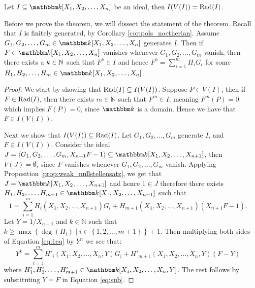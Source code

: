 \begin{theorem}\label{thm:hilbert_nullstellensatz}
  Let $I \subseteq \K[X_1, X_2, \ldots, X_{n}]$ be an ideal, then $I(V(I)) = \textnormal{Rad}(I)$.
\end{theorem}

Before we prove the theorem, we will dissect the statement of the theorem. Recall that $I$ is finitely generated, by Corollary \ref{cor:pols_noetherian}. Assume $G_1, G_2, \ldots, G_{m} \in \K[X_1, X_2, \ldots, X_{n}]$ generates $I$. Then if $F \in \K[X_1, X_2, \ldots, X_{n}]$ vanishes whenever $G_1, G_2, \ldots, G_{m}$ vanish, then there exists a $k \in \mathbb{N}$ such that $F^{k} \in I$ and hence $F^{k} = \sum_{i = 1}^{m} H_{i} G_{i}$ for some $H_1, H_2, \ldots, H_{m} \in \K[X_1, X_2, \ldots, X_{n}]$.

\begin{proof}
  We start by showing that $\textnormal{Rad}(I) \subseteq I(V(I))$. Suppose $P \in V(I)$, then if $F \in \textnormal{Rad}(I)$, then there exists $m \in \mathbb{N}$ such that $F^{m} \in I$, meaning $F^{m}(P) = 0$ which implies $F(P) = 0$, since $\K$ is a domain. Hence we have that $F \in I(V(I))$.

  Next we show that $I(V(I)) \subseteq \textnormal{Rad}(I)$. Let $G_1, G_2, \ldots, G_{m}$ generate $I$, and $F \in I(V(I))$. Consider the ideal $J = \gen{G_1, G_2, \ldots, G_{m}, X_{n + 1}F - 1} \subseteq \K[X_1, X_2, \ldots, X_{n + 1}]$, then $V(J) = \emptyset$, since $F$ vanishes whenever $G_1, G_2, \ldots, G_{m}$ vanish. Applying Proposition \ref{prop:weak_nullstellensatz}, we get that $J = \K[X_1, X_2, \ldots, X_{n + 1}]$ and hence $1 \in J$ therefore there exists $H_1, H_2, \ldots, H_{m + 1} \in \K[X_1, X_2, \ldots, X_{n + 1}]$ such that
  \begin{equation}\label{eq:1eq}
    1 = \sum_{i = 1}^{m} H_{i}(X_1, X_2, \ldots, X_{n + 1}) G_{i} + H_{m + 1}(X_1, X_2, \ldots, X_{n + 1})(X_{n + 1}F - 1).
  \end{equation}
  Let $Y = 1 / X_{n + 1}$ and $k \in \mathbb{N}$ such that $k \geq \max \left\{\deg(H_{i}) \mid i \in \left\{1, 2, \ldots, m + 1\right\}\right\} + 1$. Then multiplying both sides of Equation \eqref{eq:1eq} by $Y^{n}$ we see that:
  \begin{equation}\label{eq:sub}
    Y^{k} = \sum^{m}_{i = 1}H'_{i}(X_1, X_2, \ldots, X_{n}, Y) G_{i} + H'_{m + 1}(X_1, X_2, \ldots, X_{n}, Y) (F - Y)
  \end{equation}
  where $H'_1, H'_2, \ldots, H'_{m + 1} \in \K[X_1, X_2, \ldots, X_{n}, Y]$. The rest follows by substituting $Y = F$ in Equation \eqref{eq:sub}.
\end{proof}

